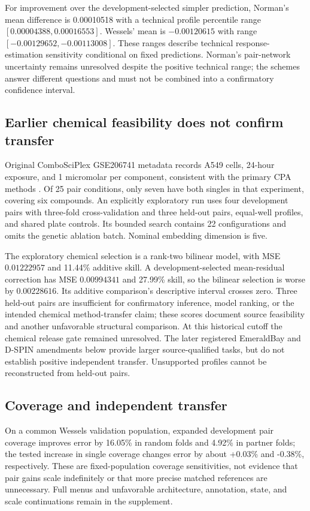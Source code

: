\documentclass{article}
\begin{document}
For improvement over the development-selected simpler prediction, Norman's mean difference is 0.00010518 with a technical profile percentile range $[0.00004388,0.00016553]$. Wessels' mean is $-0.00120615$ with range $[-0.00129652,-0.00113008]$. These ranges describe technical response-estimation sensitivity conditional on fixed predictions. Norman's pair-network uncertainty remains unresolved despite the positive technical range; the schemes answer different questions and must not be combined into a confirmatory confidence interval.

\subsection{Earlier chemical feasibility does not confirm transfer}

Original ComboSciPlex GSE206741 metadata records A549 cells, 24-hour exposure, and 1 micromolar per component, consistent with the primary CPA methods \citep{cpa2023}. Of 25 pair conditions, only seven have both singles in that experiment, covering six compounds. An explicitly exploratory run uses four development pairs with three-fold cross-validation and three held-out pairs, equal-well profiles, and shared plate controls. Its bounded search contains 22 configurations and omits the genetic ablation batch. Nominal embedding dimension is five.

The exploratory chemical selection is a rank-two bilinear model, with MSE $0.01222957$ and 11.44\% additive skill. A development-selected mean-residual correction has MSE $0.00994341$ and 27.99\% skill, so the bilinear selection is worse by $0.00228616$. Its additive comparison's descriptive interval crosses zero. Three held-out pairs are insufficient for confirmatory inference, model ranking, or the intended chemical method-transfer claim; these scores document source feasibility and another unfavorable structural comparison. At this historical cutoff the chemical release gate remained unresolved. The later registered EmeraldBay and D-SPIN amendments below provide larger source-qualified tasks, but do not establish positive independent transfer. Unsupported profiles cannot be reconstructed from held-out pairs.

\subsection{Coverage and independent transfer}
On a common Wessels validation population, expanded development pair coverage improves error by 16.05\% in random folds and 4.92\% in partner folds; the tested increase in single coverage changes error by about +0.03\% and -0.38\%, respectively. These are fixed-population coverage sensitivities, not evidence that pair gains scale indefinitely or that more precise matched references are unnecessary. Full menus and unfavorable architecture, annotation, state, and scale continuations remain in the supplement.
\end{document}
